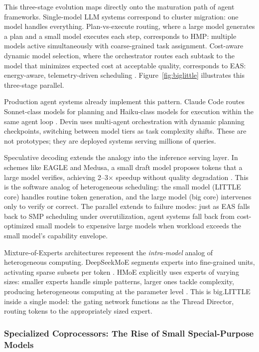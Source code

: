 This three-stage evolution maps directly onto the maturation path of agent frameworks. Single-model LLM systems correspond to cluster migration: one model handles everything. Plan-vs-execute routing, where a large model generates a plan and a small model executes each step, corresponds to HMP: multiple models active simultaneously with coarse-grained task assignment. Cost-aware dynamic model selection, where the orchestrator routes each subtask to the model that minimizes expected cost at acceptable quality, corresponds to EAS: energy-aware, telemetry-driven scheduling \cite{kumar_2003_singleISA, saez_2022_thread_director}. Figure~\ref{fig:biglittle} illustrates this three-stage parallel.



Production agent systems already implement this pattern. Claude Code routes Sonnet-class models for planning and Haiku-class models for execution within the same agent loop \cite{dive_claudecode_2026}. Devin uses multi-agent orchestration with dynamic planning checkpoints, switching between model tiers as task complexity shifts. These are not prototypes; they are deployed systems serving millions of queries.

Speculative decoding extends the analogy into the inference serving layer. In schemes like EAGLE and Medusa, a small draft model proposes tokens that a large model verifies, achieving 2--3$\times$ speedup without quality degradation \cite{li_2024_eagle}. This is the software analog of heterogeneous scheduling: the small model (LITTLE core) handles routine token generation, and the large model (big core) intervenes only to verify or correct. The parallel extends to failure modes: just as EAS falls back to SMP scheduling under overutilization, agent systems fall back from cost-optimized small models to expensive large models when workload exceeds the small model's capability envelope.

Mixture-of-Experts architectures represent the \textit{intra-model} analog of heterogeneous computing. DeepSeekMoE segments experts into fine-grained units, activating sparse subsets per token \cite{deepseek_2024_moe}. HMoE explicitly uses experts of varying sizes: smaller experts handle simple patterns, larger ones tackle complexity, producing heterogeneous computing at the parameter level \cite{wang_2024_hmoe}. This is big.LITTLE inside a single model: the gating network functions as the Thread Director, routing tokens to the appropriately sized expert.

\subsubsection{Specialized Coprocessors: The Rise of Small Special-Purpose Models}

